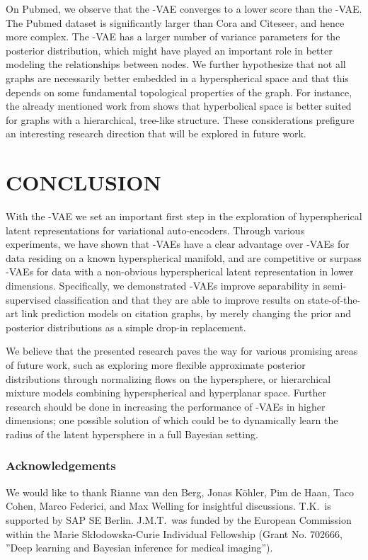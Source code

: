 \documentclass[letterpaper]{article}
\begin{document}
On Pubmed, we observe that the \Sv-VAE converges to a lower score than the \Nv-VAE. The Pubmed dataset is significantly larger than Cora and Citeseer, and hence more complex. The \Nv-VAE has a larger number of variance parameters for the posterior distribution, which might have played an important role in better modeling the relationships between nodes. We further hypothesize that not all graphs are necessarily better embedded in a hyperspherical space and that this depends on some fundamental topological properties of the graph. For instance, the already mentioned work from \citet{nickel2017poincare} shows that hyperbolical space is better suited for graphs with a hierarchical, tree-like structure. These considerations prefigure an interesting research direction that will be explored in future work. 


\section{CONCLUSION}

With the \Sv-VAE we set an important first step in the exploration of hyperspherical latent representations for variational auto-encoders. Through various experiments, we have shown that \Sv-VAEs have a clear advantage over \Nv-VAEs for data residing on a known hyperspherical manifold, and are competitive or surpass \Nv-VAEs for data with a non-obvious hyperspherical latent representation in lower dimensions. Specifically, we demonstrated \Sv-VAEs improve separability in semi-supervised classification and that they are able to improve results on state-of-the-art link prediction models on citation graphs, by merely changing the prior and posterior distributions as a simple drop-in replacement.

We believe that the presented research paves the way for various promising areas of future work, such as exploring more flexible approximate posterior distributions through normalizing flows on the hypersphere, or hierarchical mixture models combining hyperspherical and hyperplanar space. Further research should be done in increasing the performance of \Sv-VAEs in higher dimensions; one possible solution of which could be to dynamically learn the radius of the latent hypersphere in a full Bayesian setting.

\subsubsection*{Acknowledgements}
We would like to thank Rianne van den Berg, Jonas K\"ohler, Pim de Haan, Taco Cohen, Marco Federici, and Max Welling for insightful discussions. T.K.~is supported by SAP SE Berlin. J.M.T.~was funded by the European Commission within the Marie Sk\l odowska-Curie Individual Fellowship (Grant No. 702666, ”Deep learning and Bayesian inference for medical imaging”).
\end{document}
